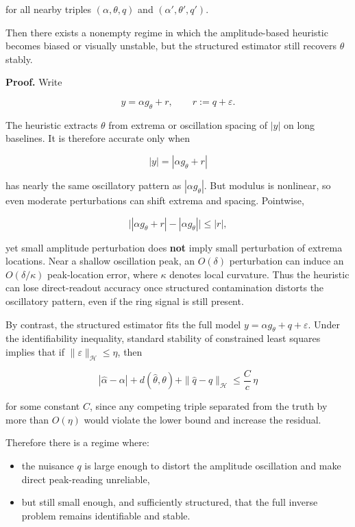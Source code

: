 \documentclass[10pt,letterpaper,twocolumn]{article}
\providecommand{\tightlist}{%
  \setlength{\itemsep}{0pt}\setlength{\parskip}{0pt}}
\begin{document}
for all nearby triples \((\alpha,\theta,q)\) and
\((\alpha',\theta',q')\).

Then there exists a nonempty regime in which the amplitude-based
heuristic becomes biased or visually unstable, but the structured
estimator still recovers \(\theta\) stably.

\par\smallskip\noindent{}\textbf{Proof.} Write

\[
y=\alpha g_\theta + r,
\qquad r:=q+\varepsilon.
\]

The heuristic extracts \(\theta\) from extrema or oscillation spacing of
\(|y|\) on long baselines. It is therefore accurate only when

\[
|y|=|\alpha g_\theta+r|
\]

has nearly the same oscillatory pattern as \(|\alpha g_\theta|\). But
modulus is nonlinear, so even moderate perturbations can shift extrema
and spacing. Pointwise,

\[
\bigl||\alpha g_\theta+r|-|\alpha g_\theta|\bigr|
\le |r|,
\]

yet small amplitude perturbation does \textbf{not} imply small
perturbation of extrema locations. Near a shallow oscillation peak, an
\(O(\delta)\) perturbation can induce an \(O(\delta/\kappa)\)
peak-location error, where \(\kappa\) denotes local curvature. Thus the
heuristic can lose direct-readout accuracy once structured contamination
distorts the oscillatory pattern, even if the ring signal is still
present.

By contrast, the structured estimator fits the full model
\(y=\alpha g_\theta+q+\varepsilon\). Under the identifiability
inequality, standard stability of constrained least squares implies that
if \(\|\varepsilon\|_{\mathcal H}\le \eta\), then

\[
|\hat\alpha-\alpha| + d(\hat\theta,\theta) + \|\hat q-q\|_{\mathcal H}
\le \frac{C}{c}\,\eta
\]

for some constant \(C\), since any competing triple separated from the
truth by more than \(O(\eta)\) would violate the lower bound and
increase the residual.

Therefore there is a regime where:

\begin{itemize}
\tightlist
\item
  the nuisance \(q\) is large enough to distort the amplitude
  oscillation and make direct peak-reading unreliable,
\item
  but still small enough, and sufficiently structured, that the full
  inverse problem remains identifiable and stable.
\end{itemize}
\end{document}
